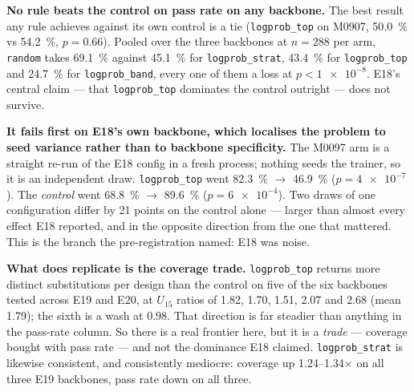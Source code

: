 \textbf{No rule beats the control on pass rate on any backbone.} The best result
any rule achieves against its own control is a tie (\texttt{logprob\_top} on
M0907, \SI{50.0}{\percent} vs \SI{54.2}{\percent}, $p = 0.66$). Pooled over the
three backbones at $n = 288$ per arm, \texttt{random} takes \SI{69.1}{\percent}
against \SI{45.1}{\percent} for \texttt{logprob\_strat}, \SI{43.4}{\percent} for
\texttt{logprob\_top} and \SI{24.7}{\percent} for \texttt{logprob\_band}, every
one of them a loss at $p < \num{1e-8}$. E18's central claim --- that
\texttt{logprob\_top} dominates the control outright --- does not survive.

\textbf{It fails first on E18's own backbone, which localises the problem to
seed variance rather than to backbone specificity.} The M0097 arm is a straight
re-run of the E18 config in a fresh process; nothing seeds the trainer, so it is
an independent draw. \texttt{logprob\_top} went \SI{82.3}{\percent} $\to$
\SI{46.9}{\percent} ($p = \num{4e-7}$). The \emph{control} went
\SI{68.8}{\percent} $\to$ \SI{89.6}{\percent} ($p = \num{6e-4}$). Two draws of
one configuration differ by 21 points on the control alone --- larger than
almost every effect E18 reported, and in the opposite direction from the one
that mattered. This is the branch the pre-registration named: E18 was noise.


\textbf{What does replicate is the coverage trade.} \texttt{logprob\_top}
returns more distinct substitutions per design than the control on five of the
six backbones tested across E19 and E20, at $U_{15}$ ratios of 1.82, 1.70, 1.51,
2.07 and 2.68 (mean \num{1.79}); the sixth is a wash at \num{0.98}. That
direction is far steadier than anything in the pass-rate column. So there is a
real frontier here, but it is a \emph{trade} --- coverage bought with pass rate
--- and not the dominance E18 claimed. \texttt{logprob\_strat} is likewise
consistent, and consistently mediocre: coverage up \numrange{1.24}{1.34}$\times$
on all three E19 backbones, pass rate down on all three.

